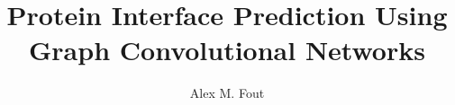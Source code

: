 \documentclass[master]{thesis}
\title{Protein Interface Prediction Using Graph Convolutional Networks}
\author{Alex M. Fout}
\begin{document}

\frontmatter %

\maketitle
\makemycopyright
\makeabstract
\makeacknowledgements


\tableofcontents
\listoftables %
\listoffigures %

\mainmatter %



















\backmatter %




\appendix %








\end{document}
